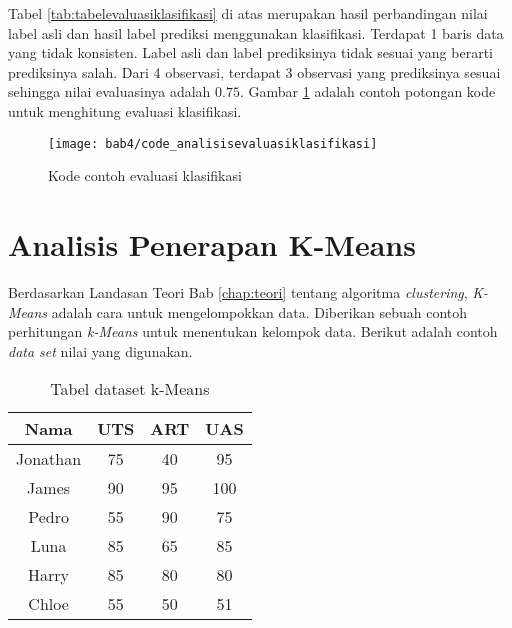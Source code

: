Tabel \ref{tab:tabelevaluasiklasifikasi} di atas merupakan hasil perbandingan nilai label asli dan hasil label prediksi menggunakan klasifikasi. Terdapat 1 baris data yang tidak konsisten. Label asli dan label prediksinya tidak sesuai yang berarti prediksinya salah. Dari 4 observasi, terdapat 3 observasi yang prediksinya sesuai sehingga nilai evaluasinya adalah $0.75$. Gambar \ref{fig:code_analisisevaluasiklasifikasi} adalah contoh potongan kode untuk menghitung evaluasi klasifikasi.

%
%
%
%
%


\begin{figure}[H]
	\centering  
	\texttt{[image: bab4/code\_analisisevaluasiklasifikasi]}   
	\caption{Kode contoh evaluasi klasifikasi}
	\label{fig:code_analisisevaluasiklasifikasi} 
\end{figure} 

\section{Analisis Penerapan K-Means}
Berdasarkan Landasan Teori Bab \ref{chap:teori} tentang algoritma \textit{clustering}, \textit{K-Means} adalah cara untuk mengelompokkan data. Diberikan sebuah contoh perhitungan \textit{k-Means} untuk menentukan kelompok data. Berikut adalah contoh \textit{data set} nilai yang digunakan.

\begin{table}[H]
\caption{Tabel dataset k-Means}
\centering
\begin{tabular}{|c|c|c|c|}
\hline 
Nama & UTS & ART & UAS \\ 
\hline 
Jonathan & 75 & 40 & 95 \\ 
\hline 
James & 90 & 95 & 100 \\ 
\hline 
Pedro & 55 & 90 & 75 \\ 
\hline 
Luna & 85 & 65 & 85 \\ 
\hline 
Harry & 85 & 80 & 80 \\ 
\hline 
Chloe & 55 & 50 & 51 \\ 
\hline 
\end{tabular} 
\label{tab:datasetkmeans}
\end{table}

